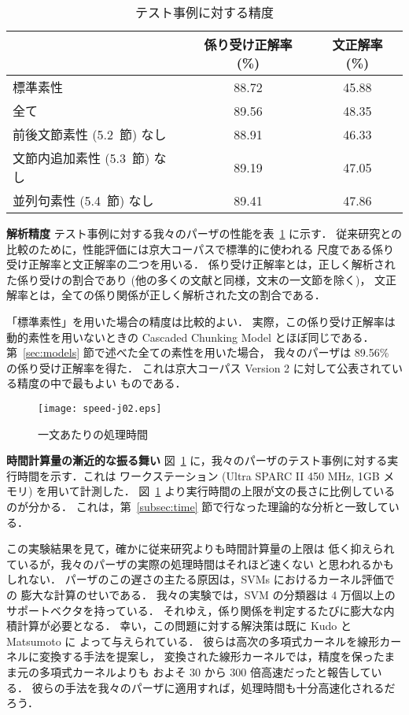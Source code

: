 \documentclass[japanese]{jnlp_1.2c}
\begin{document}
\begin{table}[b]
\caption{テスト事例に対する精度}
\label{tbl:acc}
\begin{center}
\begin{tabular}{lcc} \hline\hline
         & 係り受け正解率 (\%) & 文正解率 (\%) \\ \hline
標準素性 & 88.72        & 45.88 \\
全て     & 89.56 & 48.35 \\
前後文節素性 (5.2~節) なし & 88.91 & 46.33 \\
文節内追加素性 (5.3~節) なし  & 89.19 & 47.05 \\
並列句素性 (5.4~節) なし & 89.41 & 47.86 \\
\hline
\end{tabular}
\end{center}
\end{table}

{\bf 解析精度}\hspace{0.4em}
テスト事例に対する我々のパーザの性能を表~\ref{tbl:acc} に示す．
従来研究との比較のために，性能評価には京大コーパスで標準的に使われる
尺度である係り受け正解率と文正解率の二つを用いる．
係り受け正解率とは，正しく解析された係り受けの割合であり
(他の多くの文献と同様，文末の一文節を除く)，
文正解率とは，全ての係り関係が正しく解析された文の割合である．


「標準素性」を用いた場合の精度は比較的よい．
実際，この係り受け正解率は動的素性を用いないときの Cascaded Chunking
Model \cite{Kudo2002} とほぼ同じである．
第~\ref{sec:models} 節で述べた全ての素性を用いた場合，
我々のパーザは 89.56\% の係り受け正解率を得た．
これは京大コーパス Version 2 に対して公表されている精度の中で最もよい
ものである．

\begin{figure}[t]
\begin{center}
    \texttt{[image: speed-j02.eps]}
\end{center}
\caption{一文あたりの処理時間}
\label{speed}
\end{figure}

{\bf 時間計算量の漸近的な振る舞い}\hspace{0.4em}
図~\ref{speed} に，我々のパーザのテスト事例に対する実行時間を示す．これは
ワークステーション (Ultra SPARC II 450 MHz, 1GB メモリ) を用いて計測した．
図~\ref{speed} より実行時間の上限が文の長さに比例しているのが分かる．
これは，第~\ref{subsec:time} 節で行なった理論的な分析と一致している．

この実験結果を見て，確かに従来研究よりも時間計算量の上限は
低く抑えられているが，我々のパーザの実際の処理時間はそれほど速くない
と思われるかもしれない．
パーザのこの遅さの主たる原因は，SVMs におけるカーネル評価での
膨大な計算のせいである．
我々の実験では，SVM の分類器は 4 万個以上のサポートベクタを持っている．
それゆえ，係り関係を判定するたびに膨大な内積計算が必要となる．
幸い，この問題に対する解決策は既に Kudo と Matsumoto  に
よって与えられている．
彼らは高次の多項式カーネルを線形カーネルに変換する手法を提案し，
変換された線形カーネルでは，精度を保ったまま元の多項式カーネルよりも
およそ 30 から 300 倍高速だったと報告している．
彼らの手法を我々のパーザに適用すれば，処理時間も十分高速化されるだろう．
\end{document}
